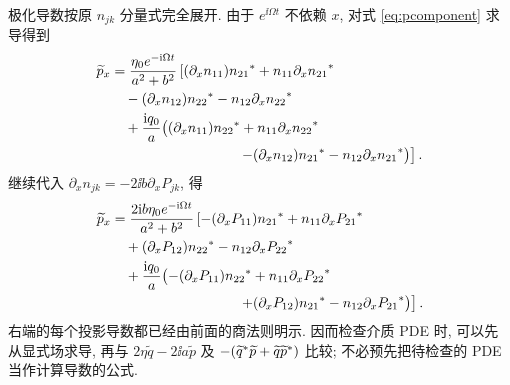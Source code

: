 \par\smallskip\noindent 极化导数按原 $n_{jk}$ 分量式完全展开.\quad
由于 $e^{\ii\Omega t}$ 不依赖 $x$, 对式 \eqref{eq:pcomponent} 求导得到
\begin{align*}
\widetilde p_x
&=\dfrac{\eta_0e^{-\ii\Omega t}}{a^2+b^2}\left[
(\partial_xn_{11})\conj{n_{21}}
+n_{11}\conj{\partial_xn_{21}}\right.\\
&\quad-(\partial_xn_{12})\conj{n_{22}}
-n_{12}\conj{\partial_xn_{22}}\\
&\quad+\dfrac{\ii q_0}{a}\bigl(
(\partial_xn_{11})\conj{n_{22}}
+n_{11}\conj{\partial_xn_{22}}\\
&\hspace{32mm}\left.
-(\partial_xn_{12})\conj{n_{21}}
-n_{12}\conj{\partial_xn_{21}}\bigr)\right].
\end{align*}
继续代入 $\partial_xn_{jk}=-2\ii b\partial_xP_{jk}$, 得
\begin{align*}
\widetilde p_x
&=\dfrac{2\ii b\eta_0e^{-\ii\Omega t}}{a^2+b^2}\left[
-(\partial_xP_{11})\conj{n_{21}}
+n_{11}\conj{\partial_xP_{21}}\right.\\
&\quad+(\partial_xP_{12})\conj{n_{22}}
-n_{12}\conj{\partial_xP_{22}}\\
&\quad+\dfrac{\ii q_0}{a}\bigl(
-(\partial_xP_{11})\conj{n_{22}}
+n_{11}\conj{\partial_xP_{22}}\\
&\hspace{32mm}\left.
+(\partial_xP_{12})\conj{n_{21}}
-n_{12}\conj{\partial_xP_{21}}\bigr)\right].
\end{align*}
右端的每个投影导数都已经由前面的商法则明示. 因而检查介质 PDE 时, 可以先从显式场求导, 再与 $2\eta\widetilde q-2\ii a\widetilde p$ 及 $-({\widetilde q}^{*}\widetilde p+\widetilde q{\widetilde p}^{*})$ 比较; 不必预先把待检查的 PDE 当作计算导数的公式.


